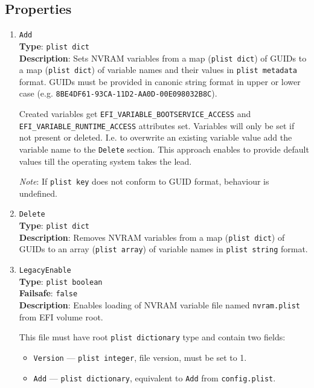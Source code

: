 \documentclass[]{article}
\providecommand{\tightlist}{%
  \setlength{\itemsep}{0pt}\setlength{\parskip}{0pt}}
\begin{document}
\subsection{Properties}\label{nvramprops}

\begin{enumerate}
\item
  \texttt{Add}\\
  \textbf{Type}: \texttt{plist\ dict}\\
  \textbf{Description}: Sets NVRAM variables from a map (\texttt{plist\ dict})
  of GUIDs to a map (\texttt{plist\ dict}) of variable names and their values
  in \texttt{plist\ metadata} format. GUIDs must be provided in canonic string
  format in upper or lower case (e.g. \texttt{8BE4DF61-93CA-11D2-AA0D-00E098032B8C}).

  Created variables get \texttt{EFI\_VARIABLE\_BOOTSERVICE\_ACCESS} and
  \texttt{EFI\_VARIABLE\_RUNTIME\_ACCESS} attributes set.
  Variables will only be set if not present or deleted. I.e. to overwrite
  an existing variable value add the variable name to the \texttt{Delete} section.
  This approach enables to provide default values till the operating system
  takes the lead.

  \emph{Note}: If \texttt{plist\ key} does not conform to GUID format,
  behaviour is undefined.

\item
  \texttt{Delete}\\
  \textbf{Type}: \texttt{plist\ dict}\\
  \textbf{Description}: Removes NVRAM variables from a map (\texttt{plist\ dict})
  of GUIDs to an array (\texttt{plist\ array}) of variable names in
  \texttt{plist\ string} format.

\item
  \texttt{LegacyEnable}\\
  \textbf{Type}: \texttt{plist\ boolean}\\
  \textbf{Failsafe}: \texttt{false}\\
  \textbf{Description}: Enables loading of NVRAM variable file named \texttt{nvram.plist}
  from EFI volume root.

  This file must have root \texttt{plist\ dictionary} type and contain two fields:
  \begin{itemize}
  \tightlist
  \item \texttt{Version} --- \texttt{plist\ integer}, file version, must be set to 1.
  \item \texttt{Add} --- \texttt{plist\ dictionary}, equivalent to \texttt{Add} from
  \texttt{config.plist}.
  \end{itemize}


\end{enumerate}
\end{document}
